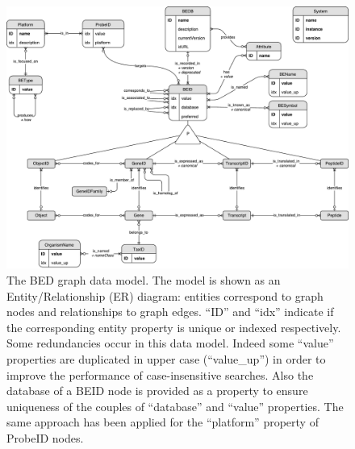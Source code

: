 \documentclass[9pt,a4paper,]{extarticle}
\theoremstyle{definition}
\theoremstyle{definition}
\theoremstyle{definition}
\theoremstyle{remark}
\begin{document}
\begin{figure}

{\centering \includegraphics[width=1\linewidth]{img/BED-Data-Model} 

}

\caption{The BED graph data model. The model is shown as an Entity/Relationship (ER) diagram: entities correspond to graph nodes and relationships to graph edges. ``ID'' and ``idx'' indicate if the corresponding entity property is unique or indexed respectively. Some redundancies occur in this data model. Indeed some ``value'' properties are duplicated in upper case (``value\_up'') in order to improve the performance of case-insensitive searches. Also the database of a BEID node is provided as a property to ensure uniqueness of the couples of ``database'' and ``value'' properties. The same approach has been applied for the ``platform'' property of ProbeID nodes.}\label{fig:Data-Model}
\end{figure}
\end{document}
